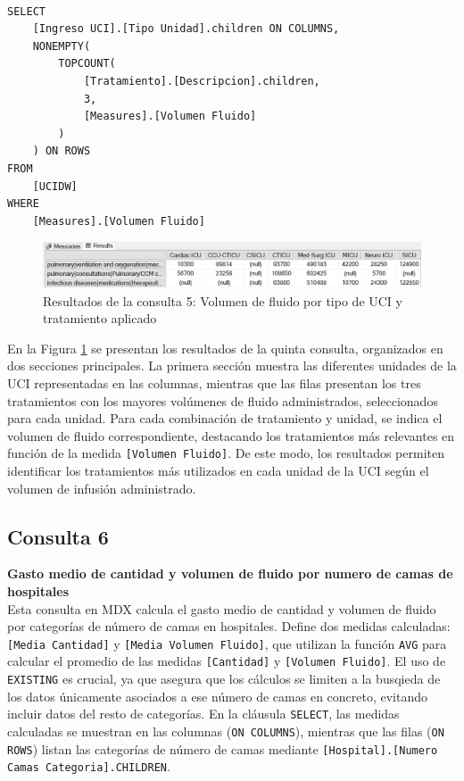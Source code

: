 \documentclass{article}
\begin{document}
\begin{lstlisting}[style=ddlstyle, label=lst:consulta5,caption=Consulta 5: Volumen de fluido por tipo de UCI y tratamiento aplicado]
	
SELECT 
	[Ingreso UCI].[Tipo Unidad].children ON COLUMNS, 
	NONEMPTY(
		TOPCOUNT(
			[Tratamiento].[Descripcion].children, 
			3, 
			[Measures].[Volumen Fluido]
		)
	) ON ROWS
FROM 
	[UCIDW]
WHERE 
	[Measures].[Volumen Fluido]
\end{lstlisting}

\begin{figure}[H]
	\centering
	\includegraphics[width=0.9\linewidth]{images/consulta5.png}
	\caption{Resultados de la consulta 5: Volumen de fluido por tipo de UCI y tratamiento aplicado}
	\label{fig:consulta5}
\end{figure}

En la Figura \ref{fig:consulta5} se presentan los resultados de la quinta consulta, organizados en dos secciones principales. La primera sección muestra las diferentes unidades de la UCI representadas en las columnas, mientras que las filas presentan los tres tratamientos con los mayores volúmenes de fluido administrados, seleccionados para cada unidad. Para cada combinación de tratamiento y unidad, se indica el volumen de fluido correspondiente, destacando los tratamientos más relevantes en función de la medida \texttt{[Volumen Fluido]}. De este modo, los resultados permiten identificar los tratamientos más utilizados en cada unidad de la UCI según el volumen de infusión administrado.


\subsection{Consulta 6}

\textbf{Gasto medio de cantidad y volumen de fluido por numero de camas de hospitales}
\\

Esta consulta en MDX calcula el gasto medio de cantidad y volumen de fluido por categorías de número de camas en hospitales. Define dos medidas calculadas: \texttt{[Media Cantidad]} y \texttt{[Media Volumen Fluido]}, que utilizan la función \texttt{AVG} para calcular el promedio de las medidas \texttt{[Cantidad]} y \texttt{[Volumen Fluido]}. El uso de \texttt{EXISTING} es crucial, ya que asegura que los cálculos se limiten a la busqieda de los datos únicamente asociados a ese número de camas en concreto, evitando incluir datos del resto de categorías. En la cláusula \texttt{SELECT}, las medidas calculadas se muestran en las columnas (\texttt{ON COLUMNS}), mientras que las filas (\texttt{ON ROWS}) listan las categorías de número de camas mediante \texttt{[Hospital].[Numero Camas Categoria].CHILDREN}.
\\
\end{document}
